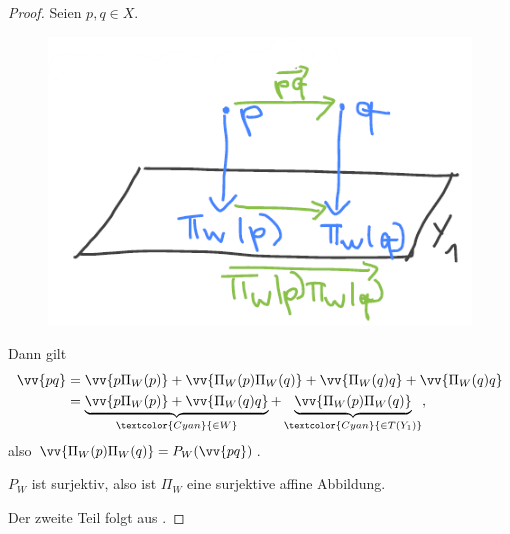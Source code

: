\begin{proof}
    Seien \( p,q\in X \).
    \begin{figure}[H]
        \centering
        \includegraphics[width=0.5\linewidth]{figures/affine_projektion_ist_affin}
        \label{fig:affine_projektion_ist_affin}
    \end{figure}
    Dann gilt
    \begin{align*}
        \vv{pq}\begin{aligned}[t] 
            &=\vv{p\Pi_W(p)}+\vv{\Pi_W(p)\Pi_W(q)}+\vv{\Pi_W(q)q}+\vv{\Pi_W(q)q}\\
            &=\underbrace{\vv{p\Pi_W(p)}+\vv{\Pi_W(q)q}}_{\textcolor{Cyan}{\in W}}+\underbrace{\vv{\Pi_W(p)\Pi_W(q)}}_{\textcolor{Cyan}{\in T(Y_1)}},
        \end{aligned}
    \end{align*}
    also \( \vv{\Pi_W(p)\Pi_W(q)}=P_W(\vv{pq}) \).

    \( P_W \) ist surjektiv, also ist \( \Pi_W \) eine surjektive affine Abbildung.

    Der zweite Teil folgt aus .
\end{proof}